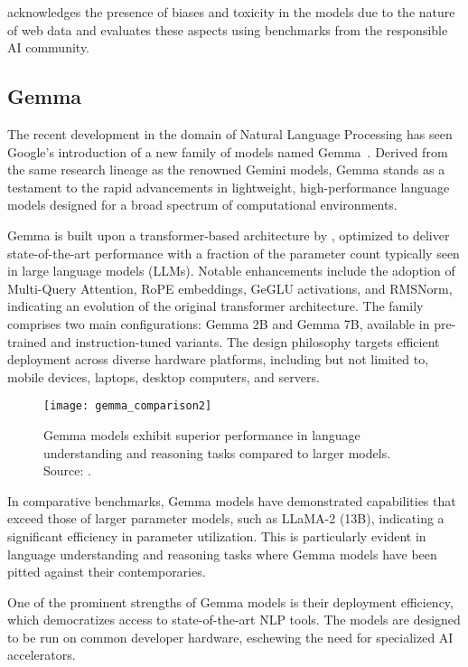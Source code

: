 \textcite{touvron2023llama} acknowledges the presence of biases and toxicity in the models due to the nature of web data and evaluates these aspects using benchmarks from the responsible AI community.

\subsection{Gemma}
\label{subsec:gemma}

The recent development in the domain of Natural Language Processing has seen Google's introduction of a new family of models named Gemma~\cite{gemma_google_ai, gemmateam2024gemma}.
Derived from the same research lineage as the renowned Gemini models, Gemma stands as a testament to the rapid advancements in lightweight, high-performance language models designed for a broad spectrum of computational environments.

Gemma is built upon a transformer-based architecture by \textcite{vaswani2023attention}, optimized to deliver state-of-the-art performance with a fraction of the parameter count typically seen in large language models (LLMs).
Notable enhancements include the adoption of Multi-Query Attention, RoPE embeddings, GeGLU activations, and RMSNorm, indicating an evolution of the original transformer architecture.
The family comprises two main configurations: Gemma 2B and Gemma 7B, available in pre-trained and instruction-tuned variants.
The design philosophy targets efficient deployment across diverse hardware platforms, including but not limited to, mobile devices, laptops, desktop computers, and servers.

\begin{figure}[ht!]
	\centering
	\texttt{[image: gemma\_comparison2]}
	\caption{Gemma models exhibit superior performance in language understanding and reasoning tasks compared to larger models. Source: \protect\textcite{gemmateam2024gemma}.}
	\label{fig:gemma-comparison2}
\end{figure}

In comparative benchmarks, Gemma models have demonstrated capabilities that exceed those of larger parameter models, such as LLaMA-2 (13B), indicating a significant efficiency in parameter utilization.
This is particularly evident in language understanding and reasoning tasks where Gemma models have been pitted against their contemporaries.

One of the prominent strengths of Gemma models is their deployment efficiency, which democratizes access to state-of-the-art NLP tools.
The models are designed to be run on common developer hardware, eschewing the need for specialized AI accelerators.

